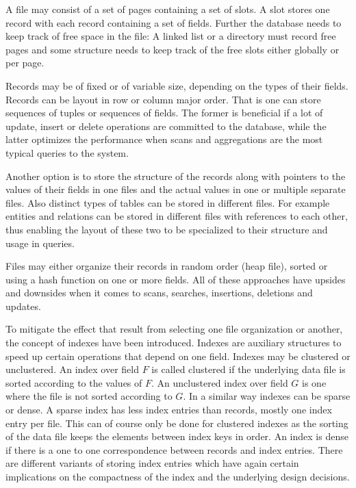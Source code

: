 \documentclass[a4paper,10pt]{article}
\begin{document}
A file may consist of a set of pages containing a set of slots. A slot stores one record with each record containing a set of fields. Further the database needs to keep track of free space in the file: A linked list or a directory must record free pages and some structure needs to keep track of the free slots either globally or per page. 

Records may be of fixed or of variable size, depending on the types of their fields. Records can be layout in row or column major order. That is one can store sequences of tuples or sequences of fields. The former is beneficial if a lot of update, insert or delete operations are committed to the database, while the latter optimizes the performance when scans and aggregations are the most typical queries to the system.

Another option is to store the structure of the records along with pointers to the values of their fields in one files and the actual values in one or multiple separate files. Also distinct types of tables can be stored in different files. For example entities and relations can be stored in different files with references to each other, thus enabling the layout of these two to be specialized to their structure and usage in queries.

Files may either organize their records in random order (heap file), sorted or using a hash function on one or more fields. All of these approaches have upsides and downsides when it comes to scans, searches, insertions, deletions and updates. 

To mitigate the effect that result from selecting one file organization or another, the concept of indexes have been introduced. Indexes are auxiliary structures to speed up certain operations that depend on one field. Indexes may be clustered or unclustered. An index over field $F$ is called clustered if the underlying data file is sorted according to the values of $F$. An unclustered index over field $G$ is one where the file is not sorted according to $G$. In a similar way indexes can be sparse or dense. A sparse index has less index entries than records, mostly one index entry per file. This can of course only be done for clustered indexes as the sorting of the data file keeps the elements between index keys in order. An index is dense if there is a one to one correspondence between records and index entries. There are different variants of storing index entries which have again certain implications on the compactness of the index and the underlying design decisions.
\end{document}
